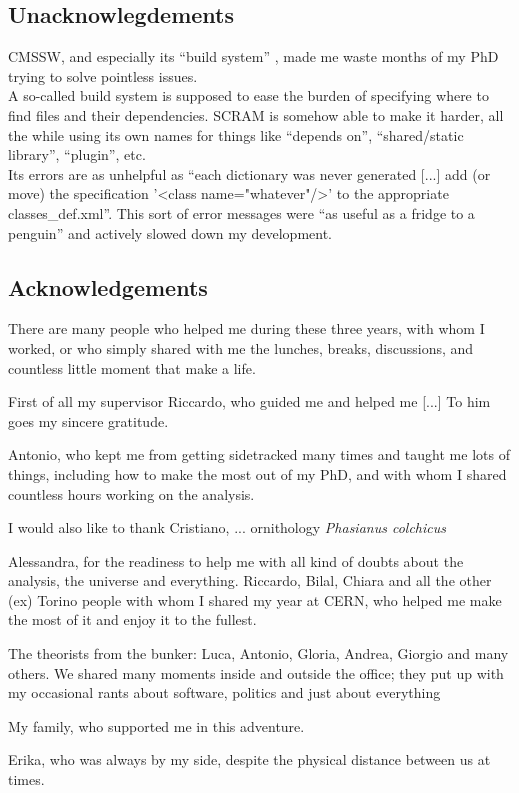 \subsection{Unacknowlegdements}
CMSSW, and especially its ``build system'' , made me waste months of my PhD trying to solve pointless issues.\\
A so-called build system is supposed to ease the burden of specifying where to find files and their dependencies.
SCRAM is somehow able to make it harder, all the while using its own names for things like ``depends on'', ``shared/static library'', ``plugin'', etc.\\
Its errors are as unhelpful as ``each dictionary was never generated [...] add (or move) the specification '<class name="whatever"/>' to the appropriate classes_def.xml''.
This sort of error messages were ``as useful as a fridge to a penguin'' and actively slowed down my development.

\subsection{Acknowledgements}
There are many people who helped me during these three years, with whom I worked, or who simply shared with me the lunches, breaks, discussions, and countless little moment that make a life.

First of all my supervisor Riccardo, who guided me and helped me [...]
To him goes my sincere gratitude.

Antonio, who kept me from getting sidetracked many times and taught me lots of things, including how to make the most out of my PhD, and with whom I shared countless hours working on the analysis.

I would also like to thank Cristiano, ...
ornithology
\textit{Phasianus colchicus}

Alessandra, for the readiness to help me with all kind of doubts about the analysis, the universe and everything.
Riccardo, Bilal, Chiara and all the other (ex) Torino people with whom I shared my year at CERN, who helped me make the most of it and enjoy it to the fullest.

The theorists from the bunker: Luca, Antonio, Gloria, Andrea, Giorgio and many others.
We shared many moments inside and outside the office;
they put up with my occasional rants about software, politics and just about everything


My family, who supported me in this adventure.

Erika, who was always by my side, despite the physical distance between us at times.
